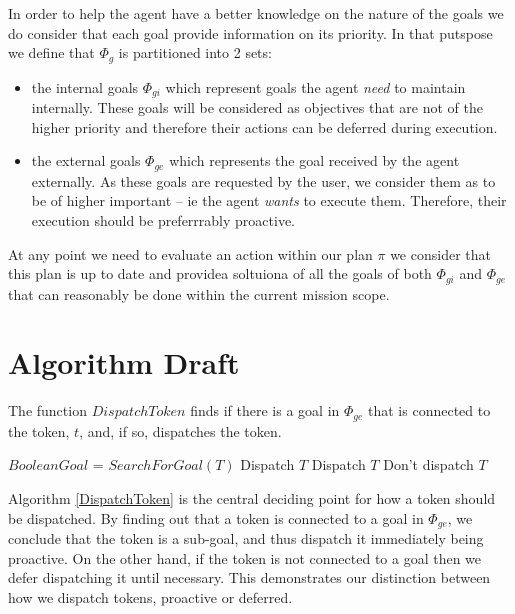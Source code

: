 In order to help the agent have a better knowledge on the nature of
the goals we do consider that each goal provide information on its
priority. In that putspose we define that $\Phi_g$ is partitioned into
2 sets:
\begin{itemize}
\item the internal goals $\Phi_{gi}$ which represent goals the agent
  {\em need} to maintain internally. These goals will be considered 
  as objectives that are not of the higher priority and therefore
  their actions can be deferred during execution.
\item the external goals $\Phi_{ge}$ which represents the goal
  received by the agent externally. As these goals are requested by
  the user, we consider them as to be of higher important -- ie the
  agent {\em wants} to execute them. Therefore, their execution should
  be preferrrably proactive.
\end{itemize}

At any point we need to evaluate an action within our plan $\pi$ we
consider that this plan is up to date and providea soltuiona of all 
the goals of both $\Phi_{gi}$ and $\Phi_{ge}$ that can reasonably  be
done within the current mission scope.


\section{Algorithm Draft}

\begin{algorithm}
\caption{The function $DispatchToken$ finds if there is a goal in $\Phi_{ge}$ that is connected
to the token, $t$, and, if so, dispatches the token.}
\label{DispatchToken}
\begin{algorithmic}
\State $Boolean Goal$ = $SearchForGoal( T )$
	\State \Return Dispatch $T$
	\State \Return Dispatch $T$
\Else
	\State \Return Don't dispatch $T$
\EndIf
\EndFunction
\end{algorithmic}
\end{algorithm}

Algorithm \ref{DispatchToken} is the central deciding point for how a token 
should be dispatched. By finding out that a token is connected to a goal in $\Phi_{ge}$, we conclude 
that the token is a sub-goal, and thus dispatch it immediately being proactive. 
On the other hand, if the token is not connected to a goal then we defer dispatching it until necessary. 
This demonstrates our distinction between how we dispatch tokens, proactive or deferred. 

